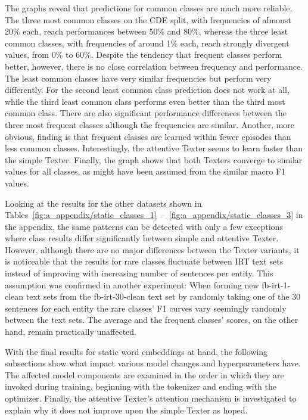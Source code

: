The graphs reveal that predictions for common classes are much more reliable. The three most common classes on the CDE split, with frequencies of almonst 20\% each, reach performances between 50\% and 80\%, whereas the three least common classes, with frequencies of around 1\% each, reach strongly divergent values, from 0\% to 60\%. Despite the tendency that frequent classes perform better, however, there is no close correlation between frequency and performance. The least common classes have very similar frequencies but perform very differently. For the second least common class prediction does not work at all, while the third least common class performs even better than the third most common class. There are also significant performance differences between the three most frequent classes although the frequencies are similar. Another, more obvious, finding is that frequent classes are learned within fewer episodes than less common classes. Interestingly, the attentive Texter seems to learn faster than the simple Texter. Finally, the graph shows that both Texters converge to similar values for all classes, as might have been assumed from the similar macro F1 values.

Looking at the results for the other datasets shown in Tables~\ref{fig:a_appendix/static_classes_1}~--~\ref{fig:a_appendix/static_classes_3} in the appendix, the same patterns can be detected with only a few exceptions where class results differ significantly between simple and attentive Texter. However, although there are no major differences between the Texter variants, it is noticeable that the results for rare classes fluctuate between IRT text sets instead of improving with increasing number of sentences per entity. This assumption was confirmed in another experiment: When forming new fb-irt-1-clean text sets from the fb-irt-30-clean text set by randomly taking one of the 30 sentences for each entity the rare classes' F1 curves vary seemingly randomly between the text sets. The average and the frequent classes' scores, on the other hand, remain practically unaffected.

With the final results for static word embeddings at hand, the following subsections show what impact various model changes and hyperparameters have. The affected model components are examined in the order in which they are invoked during training, beginning with the tokenizer and ending with the optimizer. Finally, the attentive Texter's attention mechanism is investigated to explain why it does not improve upon the simple Texter as hoped.

